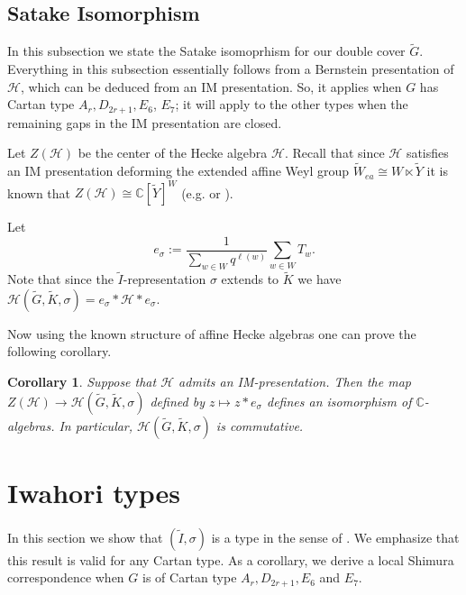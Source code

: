 \documentclass[10pt, letterpaper]{amsart}
\theoremstyle{plain}
\newtheorem{Cor}[equation]{Corollary}
\theoremstyle{definition}
\numberwithin{equation}{section}
\newcommand{\Gt}{\widetilde{G}}
\newcommand{\It}{\widetilde{I}}
\newcommand{\Kt}{\widetilde{K}}
\newcommand{\Yt}{\widetilde{Y}}
\newcommand{\Wt}{\widetilde{W}}
\newcommand{\Hcal}{\mathcal{H}}
\begin{document}

\subsection{Satake Isomorphism}\label{SS:Satake}


In this subsection we state the Satake isomoprhism for our double cover $\Gt$. Everything in this subsection essentially follows from a Bernstein presentation of $\Hcal$, which can be deduced from an IM presentation. So, it applies when $G$ has Cartan type $A_{r},D_{2r+1},E_{6}$, $E_{7}$; it will apply to the other types when the remaining gaps in the IM presentation are closed. 

Let $Z(\Hcal)$ be the center of the Hecke algebra $\Hcal$. Recall that since $\Hcal$ satisfies an IM presentation deforming the extended affine Weyl group $\Wt_{ea}\cong W\ltimes \Yt$ it is known that $Z(\Hcal)\cong \mathbb{C}[\Yt]^{W}$ (e.g. \cite{L89} or \cite[Section 2]{HKP10}).

Let 
\[
e_{\sigma}:=\frac{1}{\sum_{w\in W}q^{\ell(w)}}\sum_{w\in W} T_{w}.
\]
Note that since the $\It$-representation $\sigma$ extends to $\Kt$ we have $\Hcal(\Gt,\Kt,\sigma)=e_{\sigma}*\Hcal*e_{\sigma}$.

Now using the known structure of affine Hecke algebras one can prove the following corollary.

\begin{Cor}\label{C:Satake}
    Suppose that $\Hcal$ admits an IM-presentation. Then the map $Z(\Hcal)\rightarrow \Hcal(\Gt,\Kt,\sigma)$ defined by $z \mapsto z*e_{\sigma}$ defines an isomorphism of $\mathbb{C}$-algebras. In particular, $\Hcal(\Gt,\Kt,\sigma)$ is commutative.
\end{Cor}


\section{Iwahori types}\label{S:IwahoriType}


In this section we show that $(\It,\sigma)$ is a type in the sense of \cite[(4.1) Definition]{BK98}. We emphasize that this result is valid for any Cartan type. As a corollary, we derive a local Shimura correspondence when $G$ is of Cartan type $A_r, D_{2r+1}, E_6$ and $E_7$.
\end{document}
